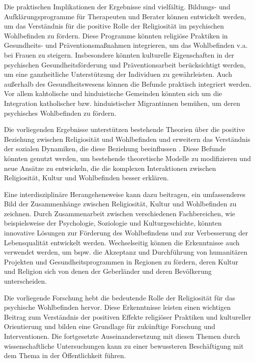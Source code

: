 Die praktischen Implikationen der Ergebnisse sind vielfältig. Bildungs- und Aufklärungsprogramme für Therapeuten und Berater können entwickelt werden, um das Verständnis für die positive Rolle der Religiosität im psychischen Wohlbefinden zu fördern. Diese Programme könnten religiöse Praktiken in Gesundheits- und Präventionsmaßnahmen integrieren, um das Wohlbefinden v.a. bei Frauen zu steigern. Insbesondere könnten kulturelle Eigenschaften in der psychischen Gesundheitsförderung und Präventionsarbeit berücksichtigt werden, um eine ganzheitliche Unterstützung der Individuen zu gewährleisten. Auch außerhalb des Gesundheitswesens können die Befunde praktisch integriert werden. Vor allem kahtolische und hinduistische Gemeinden könnten sich um die Integration katholischer bzw. hinduistischer Migrantinnen bemühen, um deren psychisches Wohlbefinden zu fördern.

Die vorliegenden Ergebnisse unterstützen bestehende Theorien über die positive Beziehung zwischen Religiosität und Wohlbefinden und erweitern das Verständnis der sozialen Dynamiken, die diese Beziehung beeinflussen \parencite{DarIqbal2019, KoenigShohaib2023, VanCapellen2016, Jokela2022, FernándezRosell2022, HoogeveenEtAl2023}. Diese Befunde könnten genutzt werden, um bestehende theoretische Modelle zu modifizieren und neue Ansätze zu entwickeln, die die komplexen Interaktionen zwischen Religiosität, Kultur und Wohlbefinden besser erklären.

Eine interdisziplinäre Herangehensweise kann dazu beitragen, ein umfassenderes Bild der Zusammenhänge zwischen Religiosität, Kultur und Wohlbefinden zu zeichnen. Durch Zusammenarbeit zwischen verschiedenen Fachbereichen, wie beispielsweise der Psychologie, Soziologie und Kulturgeschichte, könnten innovative Lösungen zur Förderung des Wohlbefindens und zur Verbesserung der Lebensqualität entwickelt werden. Wechselseitig können die Erkenntnisse auch verwendet werden, um bspw. die Akzeptanz und Durchführung von humanitären Projekten und Gesundheitsprogrammen in Regionen zu fördern, deren Kultur und Religion sich von denen der Geberländer und deren Bevölkerung unterscheiden.

Die vorliegende Forschung hebt die bedeutende Rolle der Religiosität für das psychische Wohlbefinden hervor. Diese Erkenntnisse leisten einen wichtigen Beitrag zum Verständnis der positiven Effekte religiöser Praktiken und kultureller Orientierung und bilden eine Grundlage für zukünftige Forschung und Interventionen. Die fortgesetzte Auseinandersetzung mit diesen Themen durch wissenschaftliche Untersuchungen kann zu einer bewussteren Beschäftigung mit dem Thema in der Öffentlichkeit führen.